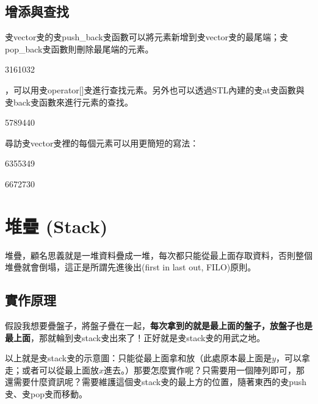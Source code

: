 \documentclass[main.tex]{subfiles}
\begin{document}
\subsection{增添與查找}
叏vector叏的叏push\_back叏函數可以將元素新增到叏vector叏的最尾端；叏pop\_back叏函數則刪除最尾端的元素。
\begin{C++}3161032\end{C++}
\indent{}，可以用叏operator[]叏進行查找元素。另外也可以透過STL內建的叏at叏函數與叏back叏函數來進行元素的查找。
\begin{C++}5789440\end{C++}
\indent\indent 尋訪叏vector叏裡的每個元素可以用更簡短的寫法：
\begin{C++}6355349\end{C++}
\indent{}
\begin{C++}6672730\end{C++}

\section{堆疊 (Stack)}

堆疊，顧名思義就是一堆資料疊成一堆，每次都只能從最上面存取資料，否則整個堆疊就會倒塌，這正是所謂先進後出(first in last out, FILO)原則。

\subsection{實作原理}
假設我想要疊盤子，將盤子疊在一起，\textbf{每次拿到的就是最上面的盤子，放盤子也是最上面}，那就輪到叏stack叏出來了！正好就是叏stack叏的用武之地。
\begin{center}
\end{center}
以上就是叏stack叏的示意圖：只能從最上面拿和放（此處原本最上面是$y$，可以拿走；或者可以從最上面放$x$進去。）那要怎麼實作呢？只需要用一個陣列即可，那還需要什麼資訊呢？需要維護這個叏stack叏的最上方的位置，隨著東西的叏push叏、叏pop叏而移動。
\end{document}
